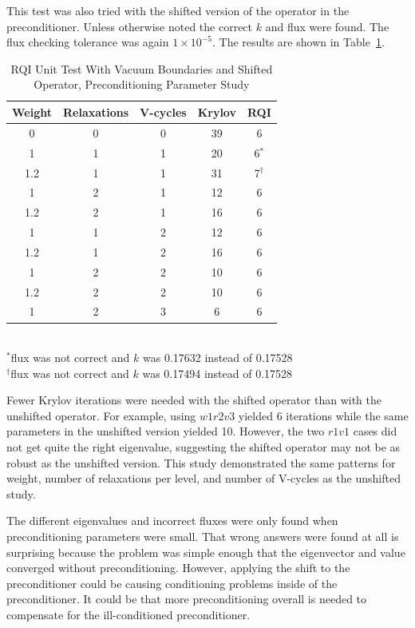 This test was also tried with the shifted version of the operator in the preconditioner. Unless otherwise noted the correct $k$ and flux were found. The flux checking tolerance was again $1 \times 10^{-5}$. The results are shown in Table~\ref{table:RQIUnitTestVacShifted}.
%
\begin{table}[!h]
\caption{RQI Unit Test With Vacuum Boundaries and Shifted Operator, Preconditioning Parameter Study}
\begin{center}
\begin{tabular}{c c c c c}
\hline
Weight & Relaxations & V-cycles & Krylov & RQI \\[0.5ex]
\hline
0    & 0 & 0 & 39 & 6 \\
1    & 1 & 1 & 20 & 6$^{*}$ \\
1.2 & 1 & 1 & 31 & 7$^{\dag}$ \\
1    & 2 & 1 & 12 & 6 \\
1.2 & 2 & 1 & 16 & 6 \\
1    & 1 & 2 & 12 & 6 \\
1.2 & 1 & 2 & 16 & 6 \\
1    & 2 & 2 & 10 & 6 \\
1.2 & 2 & 2 & 10 & 6 \\
1    & 2 & 3 & 6   & 6 \\
\hline 
\end{tabular}\\
$^{*}$flux was not correct and $k$ was 0.17632 instead of 0.17528 \\
 $^{\dag}$flux was not correct and $k$ was 0.17494 instead of 0.17528
\end{center}
\label{table:RQIUnitTestVacShifted}
\end{table}

Fewer Krylov iterations were needed with the shifted operator than with the unshifted operator. For example, using $w1r2v3$ yielded 6 iterations while the same parameters in the unshifted version yielded 10. However, the two $r1v1$ cases did not get quite the right eigenvalue, suggesting the shifted operator may not be as robust as the unshifted version. This study demonstrated the same patterns for weight, number of relaxations per level, and number of V-cycles as the unshifted study. 

The different eigenvalues and incorrect fluxes were only found when preconditioning parameters were small. That wrong answers were found at all is surprising because the problem was simple enough that the eigenvector and value converged without preconditioning. However, applying the shift to the preconditioner could be causing conditioning problems inside of the preconditioner. It could be that more preconditioning overall is needed to compensate for the ill-conditioned preconditioner.  

